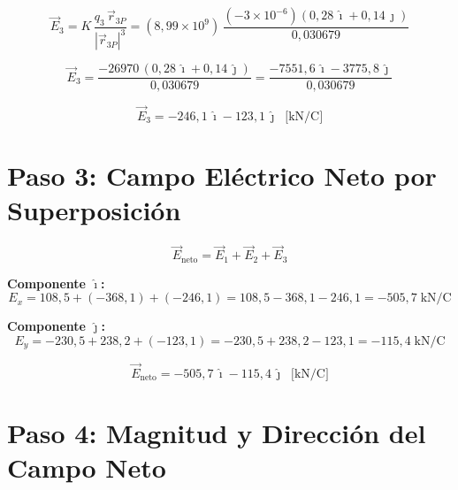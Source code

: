 \documentclass[12pt,letterpaper]{article}
\begin{document}
\begin{equation*}
\vec{E}_3 = K\,\frac{q_3\,\vec{r}_{3P}}{|\vec{r}_{3P}|^3}
= (8{,}99\times10^9)\,\frac{(-3\times10^{-6})(0{,}28\,\hat{\imath} + 0{,}14\,\hat{\jmath})}{0{,}030679}
\end{equation*}

\begin{equation*}
\vec{E}_3 = \frac{-26970\,(0{,}28\,\hat{\imath} + 0{,}14\,\hat{\jmath})}{0{,}030679}
= \frac{-7551{,}6\,\hat{\imath} - 3775{,}8\,\hat{\jmath}}{0{,}030679}
\end{equation*}

\begin{equation*}
\boxed{\vec{E}_3 = -246{,}1\,\hat{\imath} - 123{,}1\,\hat{\jmath} \;\;\text{[kN/C]}}
\end{equation*}

\section*{Paso 3: Campo El\'ectrico Neto por Superposici\'on}

\begin{equation*}
\vec{E}_{\text{neto}} = \vec{E}_1 + \vec{E}_2 + \vec{E}_3
\end{equation*}

\textbf{Componente $\hat{\imath}$:}
\begin{equation*}
E_x = 108{,}5 + (-368{,}1) + (-246{,}1) = 108{,}5 - 368{,}1 - 246{,}1 = -505{,}7\;\text{kN/C}
\end{equation*}

\textbf{Componente $\hat{\jmath}$:}
\begin{equation*}
E_y = -230{,}5 + 238{,}2 + (-123{,}1) = -230{,}5 + 238{,}2 - 123{,}1 = -115{,}4\;\text{kN/C}
\end{equation*}

\begin{equation*}
\boxed{\vec{E}_{\text{neto}} = -505{,}7\,\hat{\imath} - 115{,}4\,\hat{\jmath} \;\;\text{[kN/C]}}
\end{equation*}

\section*{Paso 4: Magnitud y Direcci\'on del Campo Neto}
\end{document}
